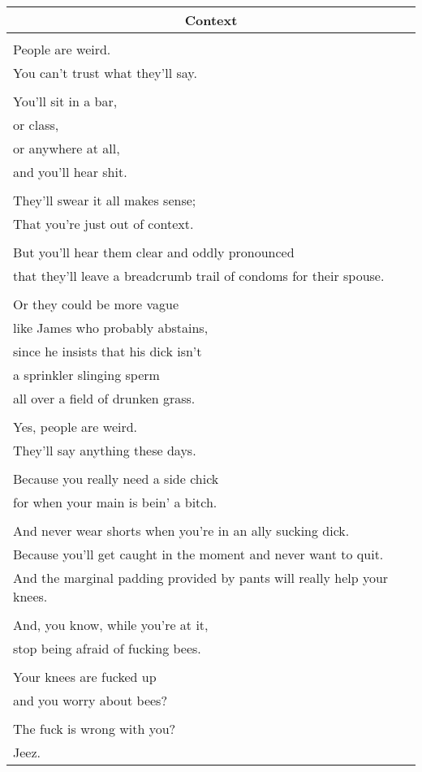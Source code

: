 \documentclass{article}
\begin{document}
\begin{center}
\begin{tabular}{l}
\multicolumn{1}{c}{\textbf{Context}} \\ \hline
\\
People are weird. \\
You can't trust what they'll say. \\
\\
You'll sit in a bar, \\
or class, \\
or anywhere at all, \\
and you'll hear shit. \\
\\
They'll swear it all makes sense; \\
That you're just out of context. \\
\\
But you'll hear them clear and oddly pronounced \\
that they'll leave a breadcrumb trail of condoms for their spouse. \\
\\
Or they could be more vague \\
like James who probably abstains, \\
since he insists that his dick isn't \\
a sprinkler slinging sperm \\
all over a field of drunken grass. \\
\\
Yes, people are weird. \\
They'll say anything these days. \\
\\
Because you really need a side chick \\
for when your main is bein' a bitch. \\
\\
And never wear shorts when you're in an ally sucking dick. \\
Because you'll get caught in the moment and never want to quit. \\
And the marginal padding provided by pants will really help your knees. \\
\\
And, you know, while you're at it, \\
stop being afraid of fucking bees. \\
\\
Your knees are fucked up \\
and you worry about bees? \\
\\
The fuck is wrong with you? \\
Jeez. \\
\end{tabular}
\end{center}
\end{document}
